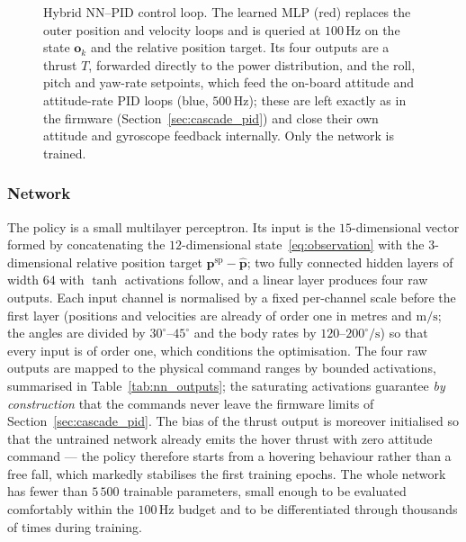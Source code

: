 \documentclass[11pt,a4paper]{article}
\theoremstyle{remark}
\numberwithin{equation}{section}
\begin{document}
\begin{figure}[H]
{}
    \caption{Hybrid NN--PID control loop. The learned MLP (red) replaces the
    outer position and velocity loops and is queried at $100\,\mathrm{Hz}$ on the
    state $\mathbf{o}_k$ and the relative position target. Its four outputs are a
    thrust $T$, forwarded directly to the power distribution, and the roll, pitch
    and yaw-rate setpoints, which feed the on-board attitude and attitude-rate
    PID loops (blue, $500\,\mathrm{Hz}$); these are left exactly as in the
    firmware (Section~\ref{sec:cascade_pid}) and close their own attitude and
    gyroscope feedback internally. Only the network is trained.}
    \label{fig:nn_pid_arch}
\end{figure}

\subsubsection*{Network}

The policy is a small multilayer perceptron. Its input is the $15$-dimensional
vector formed by concatenating the $12$-dimensional state~\eqref{eq:observation}
with the $3$-dimensional relative position target $\mathbf{p}^{\mathrm{sp}} -
\hat{\mathbf{p}}$; two fully connected hidden layers of width $64$ with
$\tanh$ activations follow, and a linear layer produces four raw outputs. Each
input channel is normalised by a fixed per-channel scale before the first layer
(positions and velocities are already of order one in metres and
$\mathrm{m/s}$; the angles are divided by $30^\circ$--$45^\circ$ and the body
rates by $120$--$200^\circ/\mathrm{s}$) so that every input is of order one, which
conditions the optimisation. The four raw outputs are mapped to the physical
command ranges by bounded activations, summarised in
Table~\ref{tab:nn_outputs}; the saturating activations guarantee \emph{by
construction} that the commands never leave the firmware limits of
Section~\ref{sec:cascade_pid}. The bias of the thrust output is moreover
initialised so that the untrained network already emits the hover thrust with
zero attitude command --- the policy therefore starts from a hovering behaviour
rather than a free fall, which markedly stabilises the first training epochs. The whole network has fewer than $5\,500$
trainable parameters, small enough to be evaluated comfortably within the
$100\,\mathrm{Hz}$ budget and to be differentiated through thousands of times
during training.
\end{document}
